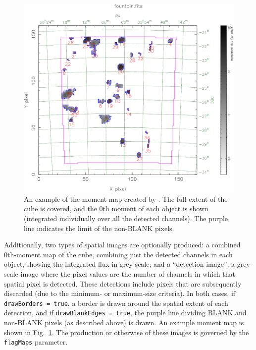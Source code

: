 \begin{figure}[!t]
  \begin{center}
    \includegraphics[width=\textwidth]{example_moment_map}
  \end{center}
  \caption{\footnotesize An example of the moment map created by
    \duchamp. The full extent of the cube is covered, and the 0th moment
    of each object is shown (integrated individually over all the
    detected channels). The purple line indicates the limit of the
    non-BLANK pixels.}
  \label{fig-moment}
\end{figure}

Additionally, two types of spatial images are optionally produced: a
combined 0th-moment map of the cube, combining just the detected
channels in each object, showing the integrated flux in grey-scale;
and a ``detection image'', a grey-scale image where the pixel values
are the number of channels in which that spatial pixel is
detected. These detections include pixels that are subsequently
discarded (due to the minimum- or maximum-size criteria). In both
cases, if \texttt{drawBorders = true}, a border is drawn around the
spatial extent of each detection, and if \texttt{drawBlankEdges =
  true}, the purple line dividing BLANK and non-BLANK pixels (as
described above) is drawn. An example moment map is shown in
Fig.~\ref{fig-moment}.  The production or otherwise of these images is
governed by the \texttt{flagMaps} parameter.

